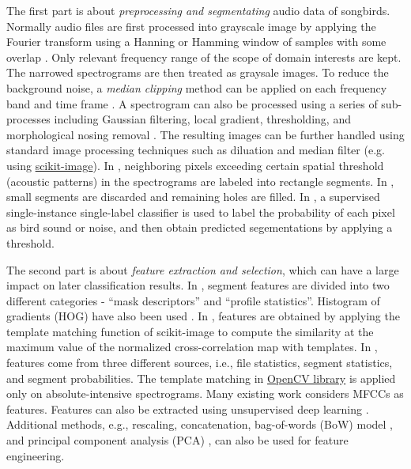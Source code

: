 \documentclass{article} %
\begin{document}
The first part is about {\em preprocessing and segmentating} audio data of songbirds. Normally audio files are first processed into grayscale image by applying the Fourier transform using a Hanning or Hamming window of samples with some overlap \cite{Lasseck13, mlsp1}. Only relevant frequency range of the scope of domain interests are kept. The narrowed spectrograms are then treated as graysale images. To reduce the background noise, a {\em median clipping} method can be applied on each frequency band and time frame
\cite{mlsp1}. A spectrogram can also be processed using a series of sub-processes including Gaussian filtering, local gradient, thresholding, and morphological nosing removal \cite{fodor2013ninth}. The resulting images can be further handled using standard image processing techniques such as diluation and median filter (e.g. using \href{http://scikit-image.org/}{scikit-image}). In \cite{Lasseck13}, neighboring pixels exceeding certain spatial threshold (acoustic patterns) in the spectrograms are labeled into rectangle segments. In \cite{fodor2013ninth}, small segments are discarded and remaining holes are filled. In \cite{mlsp1}, a supervised single-instance single-label classifier is used to label the probability of each pixel as bird sound or noise, and then obtain predicted segementations by applying a threshold.

The second part is about {\em feature extraction and selection}, which can have a large impact on later classification results. In \cite{mlsp1}, segment features are divided into two different categories - ``mask descriptors'' and ``profile statistics''. Histogram of gradients (HOG) have also been used \cite{mlsp1}. In \cite{fodor2013ninth}, features are obtained by applying the template matching function of scikit-image to compute the similarity at the maximum value of the normalized cross-correlation map with templates. In \cite{Lasseck13}, features come from three different sources, i.e., file statistics, segment statistics, and segment probabilities. The template matching in \href{http://opencv.org}{OpenCV library} is applied only on absolute-intensive spectrograms. Many existing work \cite{Stowell_NIPSW13,dufour2013clusterized,chennovel13,Massaron13} considers MFCCs%
as features.  Features can also be extracted using unsupervised deep learning \cite{Mencia_NIPSW13}. Additional methods, e.g., rescaling\cite{mlsp1}, concatenation\cite{dufour2013clusterized}, bag-of-words (BoW) model \cite{Li_CVPR05}, and principal component analysis (PCA) \cite{jolliffe2005principal}, can also be used for feature engineering. 
\end{document}
